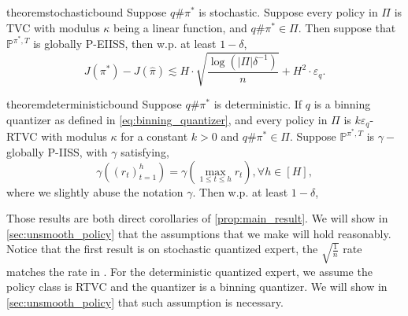 \documentclass{article}
\newcommand{\arxiv}[1]{\iftoggle{icml}{}{#1}}
\newcommand{\icml}[1]{\iftoggle{icml}{#1}{}}
\begin{document}
\begin{restatable}{theorem}{stochasticbound}\label{thm:stochastic_bound}
    Suppose $q\#\pi^*$ is stochastic. Suppose every policy in $\Pi$ is TVC with modulus $\kappa$ being a linear function, and $q\#\pi^*\in \Pi$. Then suppose that $\mathbb P^{\pi^*, T}$ is globally P-EIISS, then w.p. at least $1-\delta$,
    \begin{equation*}
                J(\pi^*)-J(\hat \pi)\lesssim H\cdot\sqrt{\frac{\log (|\Pi|\delta^{-1})}{n}}+H^2\cdot \varepsilon_q.
    \end{equation*}
\end{restatable}

\begin{restatable}{theorem}{deterministicbound}\label{thm:deterministic_bound}
Suppose $q\#\pi^*$ is deterministic. If $q$ is a binning quantizer as defined in \cref{eq:binning_quantizer}, and  every policy in $\Pi$ is $k\varepsilon_q$-RTVC with modulus $\kappa$ for a constant $k>0$ and $q\#\pi^*\in \Pi$. Suppose $\mathbb P^{\pi^*, T}$ is $\gamma-$globally P-IISS, with $\gamma$ satisfying,
\begin{equation*}
    \gamma((r_{t})_{t=1}^h)=\gamma(\max_{1\leq t\leq h} r_t),\forall h\in[H],
\end{equation*}
where we slightly abuse the notation $\gamma$. Then w.p. at least $1-\delta$,
\icml{
\begin{align*}
    J(\pi^*)-J(\hat \pi)\lesssim &H\cdot \frac{\log(|\Pi|\delta^{-1})}{n}+H^2 \kappa\left(\gamma((k+1)\varepsilon_q\right)\\
    &+H[(\gamma((k+1)\varepsilon_q)+(k+1)\varepsilon_q]
\end{align*}
}
\arxiv{
\begin{align*}
    J(\pi^*)-J(\hat \pi)\lesssim H\cdot \frac{\log(|\Pi|\delta^{-1})}{n}+H^2 \kappa\left(\gamma((k+1)\varepsilon_q)\right)+H[\gamma((k+1)\varepsilon_q)+(k+1)\varepsilon_q].
\end{align*}
}
\end{restatable}

Those results are both direct corollaries of \cref{prop:main_result}. We will show in \cref{sec:unsmooth_policy} that the assumptions that we make will hold reasonably. Notice that the first result is on stochastic quantized expert, the $\sqrt{\frac{1}{n}}$ rate matches the rate in \citet{foster2024behavior}. For the deterministic quantized expert, we assume the policy class is RTVC and the quantizer is a binning quantizer. We will show in \cref{sec:unsmooth_policy} that such assumption is necessary.
\end{document}
